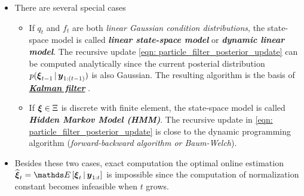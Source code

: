 \documentclass[11pt]{article}
\begin{document}
\begin{itemize}
\item There are several special cases 
\begin{itemize}
\item If $q_t$ and $f_t$ are both \emph{linear Gaussian condition distributions}, the state-space model is called \emph{\textbf{linear state-space model}} or \emph{\textbf{dynamic linear model}}. The recursive update \eqref{eqn: particle_filter_posterior_update} can be computed analytically since the current posterial distribution $p(\boldsymbol{\xi}_{t-1}\,|\,\boldsymbol{y}_{1:(t-1)})$ is also Gaussian. The resulting algorithm is the basis of \underline{\emph{\textbf{Kalman filter}}} \citep{liu2001monte}. 

\item If $\boldsymbol{\xi} \in \Xi$ is discrete with finite element, the state-space model is called \textbf{\emph{Hidden Markov Model (HMM)}}. The recursive update in \eqref{eqn: particle_filter_posterior_update} is close to the dynamic programming algorithm (\emph{forward-backward algorithm or Baum-Welch}).
\end{itemize}

\item Besides these two cases, exact computation the optimal online estimation $\widehat{\mb{\xi}}_{t} = \E{}{\mb{\xi}_{t} \,|\, \mb{y}_{1:t}}$ is impossible since the computation of normalization constant becomes infeasible when $t$ grows.


\end{itemize}
\end{document}
